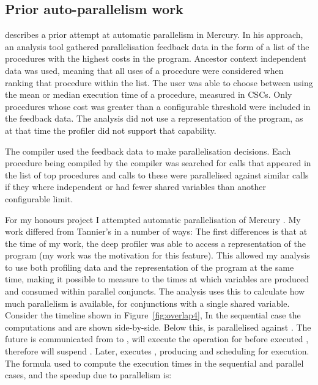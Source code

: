 \subsection{Prior auto-parallelism work}
\label{sec:backgnd_priorautopar}

\citet{tannier:2007:parallel_mercury} describes a prior attempt at automatic
parallelism in Mercury.
In his approach, 
an analysis tool gathered parallelisation feedback data in the form of
a list of the procedures with the highest costs in the program.
Ancestor context independent data was used,
meaning that all uses of a procedure were considered when ranking that
procedure within the list.
The user was able to choose between using the mean or median
execution time of a procedure, measured in CSCs.
Only procedures whose cost was greater than a configurable threshold were
included in the feedback data.
The analysis did not use a representation of the program,
as at that time the profiler did not support that capability.

The compiler used the feedback data to make parallelisation decisions.
Each procedure being compiled by the compiler was searched for calls that
appeared in the list of top procedures and calls to these were parallelised
against similar calls if they where independent or had fewer shared
variables than another configurable limit.

\label{honours_autopar}
For my honours project I attempted automatic parallelisation of Mercury
\citep{bone:2008:hons}.
My work differed from Tannier's in a number of ways:
The first differences is that at the time of my work,
the deep profiler was able to access a representation of the program
(my work was the motivation for this feature).
This allowed my analysis to use both profiling data and the representation
of the program at the same time,
making it possible to measure to the times at which variables are produced
and consumed within parallel conjuncts.
The analysis uses this to calculate how much parallelism is available,
for conjunctions with a single shared variable.
Consider the timeline shown in Figure~\ref{fig:overlap4},
In the sequential case the computations  and  are shown
side-by-side.
Below this,  is parallelised against .
The future  is communicated from  to ,
 will execute the \wait operation for 
before  executed \signal, therefore \wait will suspend .
Later,  executes \signal, producing 
and scheduling  for execution.
The formula used to compute the execution times in the sequential and parallel
cases, and the speedup due to parallelism is:

